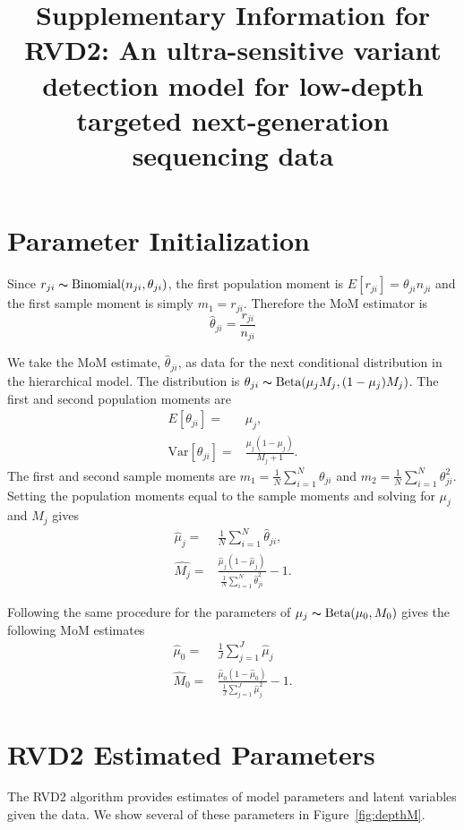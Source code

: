 \documentclass[11pt,reqno]{amsart}
\title[RVD2: Supplementary Information]{Supplementary Information for
  RVD2: An ultra-sensitive variant detection model for low-depth targeted next-generation sequencing data}
\begin{document}
\maketitle


\section{Parameter Initialization}\label{sec:appendix_mom}
Since $r_{ji} \thicksim \text{Binomial}(n_{ji}, \theta_{ji})$, the first population moment is  $E[r_{ji}] = \theta_{ji} n_{ji}$ and the first sample moment is simply $m_1 = r_{ji}$. Therefore the MoM estimator is
\begin{equation}
	\hat{\theta}_{ji} = \frac{r_{ji}} {n_{ji}}
\end{equation}

We take the MoM estimate, $\hat{\theta}_{ji}$, as data for the next conditional distribution in the hierarchical model. The distribution is $\theta_{ji} \thicksim \text{Beta}(\mu_jM_j, (1-\mu_j)M_j)$. The first and second population moments are
\begin{eqnarray}
	E[\theta_{ji}] =& \mu_j,\\
	\text{Var}[\theta_{ji}] =& \frac{\mu_j(1-\mu_j)} { M_j + 1 }.
\end{eqnarray}
The first and second sample moments are $m_1 = \frac{1}{N}\sum_{i=1}^N \theta_{ji}$ and $m_2 = \frac{1}{N}\sum_{i=1}^N \theta_{ji}^2$. Setting the population moments equal to the sample moments and solving for $\mu_j$ and $M_j$ gives
\begin{eqnarray}
	\hat{\mu}_j =& \frac{1}{N} \sum_{i=1}^N \hat{\theta}_{ji}, \\
	\hat{M_j} =& \frac{ \hat{\mu}_j (1 - \hat{\mu}_j ) } { \frac{1}{N} \sum_{i=1}^N \hat{\theta}_{ji}^2 } -1.
\end{eqnarray}

Following the same procedure for the parameters of $\mu_j \thicksim \text{Beta}(\mu_0, M_0)$ gives the following MoM estimates
\begin{eqnarray}
	\hat{\mu}_0 =& \frac{1}{J} \sum_{j=1}^J \hat{\mu}_j \\
	\hat{M}_0 =& \frac{ \hat{\mu}_0 (1 - \hat{\mu}_0 ) } {\frac{1}{J} \sum_{j=1}^J \hat{\mu}_j^2 } -1.
\end{eqnarray}



\section{RVD2 Estimated Parameters}\label{sec:synthetic_estimate}
The RVD2 algorithm provides estimates of model parameters and latent variables given the data. We show several of these parameters in Figure~\ref{fig:depthM}.
\end{document}

